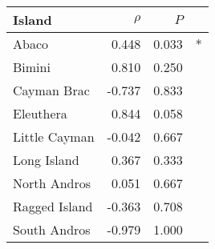 
\begin{tabular}{lrrl}
\toprule
Island & $\rho$ & $P$ & \\
\midrule
Abaco & 0.448 & 0.033 & *\\
Bimini & 0.810 & 0.250 & \\
Cayman Brac & -0.737 & 0.833 & \\
Eleuthera & 0.844 & 0.058 & \\
Little Cayman & -0.042 & 0.667 & \\
Long Island & 0.367 & 0.333 & \\
North Andros & 0.051 & 0.667 & \\
Ragged Island & -0.363 & 0.708 & \\
South Andros & -0.979 & 1.000 & \\
\bottomrule
\end{tabular}